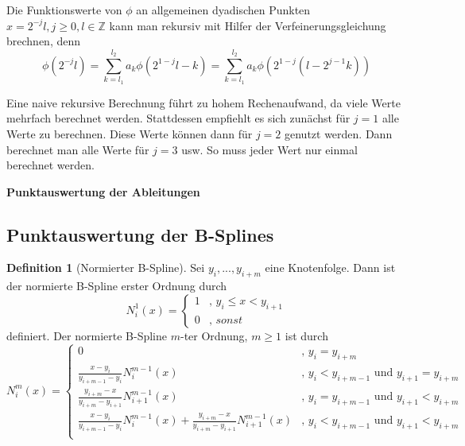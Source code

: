 \documentclass[11pt,a4paper,titlepage]{article}
\theoremstyle{plain} %
\theoremstyle{definition} %
\newtheorem{definition}[satz]{Definition}
\numberwithin{equation}{section} %
\begin{document}
	Die Funktionswerte von $\phi$ an allgemeinen dyadischen Punkten $x=2^{-j}l, j\ge 0, l\in \mathbb{Z}$ kann man rekursiv mit Hilfer der Verfeinerungsgleichung brechnen, denn
	\begin{equation}
		\phi(2^{-j}l)=\sum_{k=l_1} ^{l_2} a_k \phi(2^{1-j}l -k)=\sum_{k=l_1} ^{l_2} a_k \phi(2^{1-j}(l -2^{j-1}k))
	\end{equation}
	
	Eine naive rekursive Berechnung führt zu hohem Rechenaufwand, da viele Werte mehrfach berechnet werden. Stattdessen empfiehlt es sich zunächst für $j=1$ alle Werte zu berechnen. Diese Werte können dann für $j=2$ genutzt werden. Dann berechnet man alle Werte für $j=3$ usw. So muss jeder Wert nur einmal berechnet werden.
	
	\textbf{Punktauswertung der Ableitungen}\\
	
	
	
	
	\subsection{Punktauswertung der B-Splines}
	 \begin{definition}[Normierter B-Spline]
	 	Sei $y_i, ... , y_{i + m}$ eine Knotenfolge. Dann ist der normierte B-Spline erster Ordnung
	 	durch
	 	\begin{equation}
	 		N_i^1(x) = \begin{cases}
	 			1 &\mbox{, } y_i \leq x < y_{i + 1} \\
	 			0 & \mbox{, } sonst
	 		\end{cases}
	 	\end{equation}
	 	definiert.
	 	Der normierte B-Spline $m$-ter Ordnung, $m \geq 1$ ist durch
	 	\begin{equation}
	 		N_i^m (x) = \begin{cases} 			
	 			0 & \mbox{, } y_i=y_{i+m} \\
	 			\frac{x - y_i}{y_{i + m - 1} - y_i} N_i^{m - 1} (x)	  	&\mbox{, } y_i<y_{i+m-1} \text{ und } y_{i+1}=y_{i+m}  \\
	 			\frac{y_{ i + m} - x}{y_{i + m} - y_{i + 1}} N_{i + 1}^{m - 1} (x)  	&\mbox{, } y_i=y_{i+m-1}  \text{ und } y_{i+1}<y_{i+m}  \\
	 			\frac{x - y_i}{y_{i + m - 1} - y_i} N_i^{m - 1} (x)	+\frac{y_{ i + m} - x}{y_{i + m} - y_{i + 1}} N_{i + 1}^{m - 1} (x)  		&\mbox{, } y_i<y_{i+m-1}  \text{ und } y_{i+1}<y_{i+m}  \\
	 		\end{cases}
	 	\end{equation}
	 \end{definition}
	 
\end{document}

